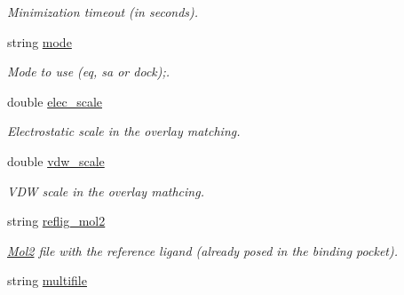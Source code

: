 \begin{DoxyCompactItemize}
\begin{DoxyCompactList}\small\item\em Minimization timeout (in seconds). \item\end{DoxyCompactList}\item 
\hypertarget{classPARSER_ab0cd7619a844099f17a979916b1dd4d8}{
string \hyperlink{classPARSER_ab0cd7619a844099f17a979916b1dd4d8}{mode}}
\label{classPARSER_ab0cd7619a844099f17a979916b1dd4d8}

\begin{DoxyCompactList}\small\item\em Mode to use (eq, sa or dock);. \item\end{DoxyCompactList}\item 
\hypertarget{classPARSER_ad41e42057523395b33af742e773050e8}{
double \hyperlink{classPARSER_ad41e42057523395b33af742e773050e8}{elec\_\-scale}}
\label{classPARSER_ad41e42057523395b33af742e773050e8}

\begin{DoxyCompactList}\small\item\em Electrostatic scale in the overlay matching. \item\end{DoxyCompactList}\item 
\hypertarget{classPARSER_ad4a8e86b35efdb2174533a609864bd8d}{
double \hyperlink{classPARSER_ad4a8e86b35efdb2174533a609864bd8d}{vdw\_\-scale}}
\label{classPARSER_ad4a8e86b35efdb2174533a609864bd8d}

\begin{DoxyCompactList}\small\item\em VDW scale in the overlay mathcing. \item\end{DoxyCompactList}\item 
\hypertarget{classPARSER_a898e1966b8ad636d8a3ff2d71d6a00f6}{
string \hyperlink{classPARSER_a898e1966b8ad636d8a3ff2d71d6a00f6}{reflig\_\-mol2}}
\label{classPARSER_a898e1966b8ad636d8a3ff2d71d6a00f6}

\begin{DoxyCompactList}\small\item\em \hyperlink{classMol2}{Mol2} file with the reference ligand (already posed in the binding pocket). \item\end{DoxyCompactList}\item 
\hypertarget{classPARSER_aaf568d2815d54bc4878c0bb87d7a8a60}{
string \hyperlink{classPARSER_aaf568d2815d54bc4878c0bb87d7a8a60}{multifile}}
\label{classPARSER_aaf568d2815d54bc4878c0bb87d7a8a60}


\end{DoxyCompactItemize}
